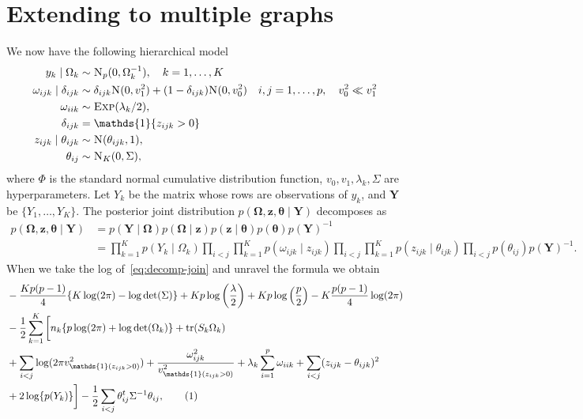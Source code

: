 \documentclass[a4paper, 11pt, oneside]{report}
\DeclareMathOperator{\tr}{tr}
\newcommand{\1}{\mathds{1}}
\newcommand{\inv}{^{-1}}
\newcommand{\Np}{\textsc{N}_p}
\newcommand{\Nor}{\textsc{N}}
\newcommand{\Exp}{\textsc{Exp}}
\newcommand{\bOmega}{\mathbf{\Omega}}
\newcommand{\bz}{\mathbf{z}}
\newcommand{\btheta}{\mathbf{\theta}}
\newcommand{\bY}{\mathbf{Y}}
\begin{document}
\chapter{Extending to multiple graphs}
We now have the following hierarchical model
\begin{align*}
	y_k \mid \Omega_k              & \sim \Np(0, \Omega_k^{-1}), \quad k=1,\dots,K                                                                     \\
	\omega_{ijk} \mid \delta_{ijk} & \sim \delta_{ijk} \Nor(0, v_1^2) + (1 - \delta_{ijk}) \Nor(0, v_0^2) \quad i,j = 1,\dots,p, \quad v_0^2 \ll v_1^2 \\
	\omega_{iik}                   & \sim \Exp(\lambda_k/2),                                                                                           \\
	\delta_{ijk}                   & = \1\{z_{ijk} > 0\}                                                                                               \\
	z_{ijk} \mid \theta_{ijk}      & \sim \Nor(\theta_{ijk}, 1),                                                                                       \\
	\theta_{ij}                    & \sim \textsc{N}_K(0, \Sigma),
\end{align*}
where $\Phi$ is the standard normal cumulative distribution function, $v_0,
	v_1, \lambda_k, \Sigma$ are hyperparameters.
Let $Y_k$ be the matrix whose rows are observations of $y_k$, and $\mathbf{Y}$
be $\{Y_1,\dots,Y_K\}$.
The posterior joint distribution $p(\mathbf{\Omega},  \mathbf{z},
	\mathbf{\theta} \mid \mathbf{Y})$ decomposes as
\begin{align}\label{eq:decomp-join}
	p(\bOmega,  \bz, \btheta \mid \bY) & = p(\bY \mid \bOmega) p(\bOmega \mid \bz)
	p(\bz \mid \btheta) p(\btheta) p(\bY)\inv \nonumber                            \\
	                                   & = \prod_{k=1}^K p(Y_k \mid \Omega_k)
	\prod_{i < j}\prod_{k=1}^K p(\omega_{ijk}
	\mid z_{ijk}) \prod_{i < j}\prod_{k=1}^K
	p(z_{ijk} \mid \theta_{ijk})\prod_{i <
		j} p(\theta_{ij}) p(\bY)\inv.
\end{align}
When we take the log of~\ref{eq:decomp-join} and unravel the formula we obtain
\begin{align*}
	 & -\frac{Kp(p-1)}{4}\{K \log(2\pi) - \log\det(\Sigma)\} + K p
	\log\left(\frac{\lambda}{2}\right) + K p \log\left(\frac{p}{2}\right) - K
	\frac{p(p-1)}{4} \log(2\pi)                                                                  \\
	 & - \frac{1}{2} \sum_{k=1}^K \bigg[ n_k \{p \log(2\pi) + \log\det(\Omega_k)\} +
	\tr(S_k \Omega_k)                                                                            \\
	 & + \sum_{i < j} \log(2\pi v^2_{\1(z_{ijk} > 0)}) +
	\frac{\omega_{ijk}^2}{v^2_{\1(z_{ijk} > 0)}} + \lambda_k \sum_{i=1}^p
	\omega_{iik} + \sum_{i < j} (z_{ijk} - \theta_{ijk})^2                                       \\
	 & + 2 \log\{p(Y_k)\} \bigg] -\frac{1}{2} \sum_{i < j} \theta_{ij}^t \Sigma\inv \theta_{ij},
	\stepcounter{equation}\tag{\theequation}\label{eq:mg-joint}
\end{align*}
\end{document}
